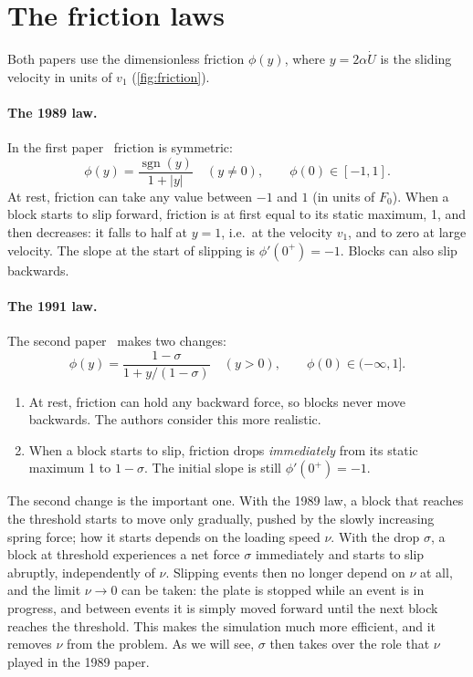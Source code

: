 \section{The friction laws}
\label{sec:bk-friction}

Both papers use the dimensionless friction $\phi(y)$, where $y=2\alpha\dot U$ is the sliding velocity in units of $v_1$
(\cref{fig:friction}).

\paragraph{The 1989 law.} In the first paper~\cite{CarlsonLanger1989} friction is symmetric:
\begin{equation}
  \phi(y) = \frac{\operatorname{sgn}(y)}{1+|y|}\quad(y\neq0),\qquad \phi(0)\in[-1,1].
  \label{eq:phi89}
\end{equation}
At rest, friction can take any value between $-1$ and $1$ (in units of $F_0$). When a block starts to slip forward,
friction is at first equal to its static maximum, 1, and then decreases: it falls to half at $y=1$, i.e.\ at the velocity
$v_1$, and to zero at large velocity. The slope at the start of slipping is $\phi'(0^+) = -1$. Blocks can also slip
backwards.

\paragraph{The 1991 law.} The second paper~\cite{Carlson1991} makes two changes:
\begin{equation}
  \phi(y) = \frac{1-\sigma}{1+y/(1-\sigma)}\quad(y>0),\qquad \phi(0)\in(-\infty,1].
  \label{eq:phi91}
\end{equation}
\begin{enumerate}
  \item At rest, friction can hold any backward force, so blocks never move backwards. The authors consider this more
    realistic.
  \item When a block starts to slip, friction drops \emph{immediately} from its static maximum 1 to $1-\sigma$. The initial
    slope is still $\phi'(0^+)=-1$.
\end{enumerate}
The second change is the important one. With the 1989 law, a block that reaches the threshold starts to move only
gradually, pushed by the slowly increasing spring force; how it starts depends on the loading speed $\nu$. With the
drop $\sigma$, a block at threshold experiences a net force $\sigma$ immediately and starts to slip abruptly, independently
of $\nu$. Slipping events then no longer depend on $\nu$ at all, and the limit $\nu\to0$ can be taken: the plate is
stopped while an event is in progress, and between events it is simply moved forward until the next block reaches
the threshold. This makes the simulation much more efficient, and it removes $\nu$ from the problem. As we will see,
$\sigma$ then takes over the role that $\nu$ played in the 1989 paper.

